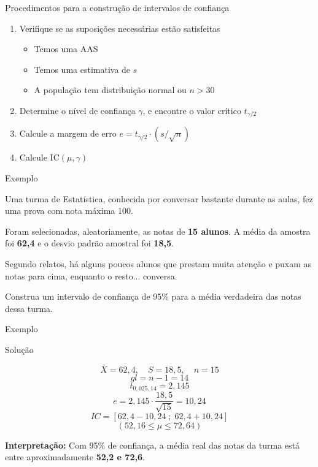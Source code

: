 \documentclass[14pt,aspectratio=1610]{beamer}
\begin{document}
	\begin{frame}{Procedimentos para a construção de intervalos de confiança}
		\begin{block}{}
			\justifying
			\begin{enumerate}
				\item Verifique se as suposições necessárias estão satisfeitas
				\begin{itemize}
					\item Temos uma AAS
					\item Temos uma estimativa de $s$
					\item A população tem distribuição normal ou $n>30$
				\end{itemize}
				
				\item Determine o nível de confiança $\gamma$, e encontre o valor crítico $t_{\gamma/2}$
				\item Calcule a margem de erro $e = t_{\gamma/2} \cdot (s/\sqrt{n})$
				\item Calcule $\text{IC}(\mu, \gamma)$
			\end{enumerate}   
		\end{block}
	\end{frame}
	
	\begin{frame}{Exemplo}
		
		\begin{block}{}
			\justifying
			
			Uma turma de Estatística, conhecida por conversar bastante durante as aulas, fez uma prova com nota máxima 100.
			
			Foram selecionadas, aleatoriamente, as notas de \textbf{15 alunos}. A média da amostra foi \textbf{62,4} e o desvio padrão amostral foi \textbf{18,5}.
			
			Segundo relatos, há alguns poucos alunos que prestam muita atenção e puxam as notas para cima, enquanto o resto... conversa.
			
			Construa um intervalo de confiança de 95\% para a média verdadeira das notas dessa turma.
			
		\end{block}
		
	\end{frame}
	
	\begin{frame}{Exemplo}
		
	\small	
		\begin{block}{Solução}
			
			\[
			\bar{X} = 62,4, \quad S = 18,5, \quad n = 15
			\]
			\[
			gl = n - 1 = 14
			\]
			\[
			t_{0,025, 14} = 2,145
			\]
			\[
			e = 2,145 \cdot \frac{18,5}{\sqrt{15}} = 10,24
			\]
			\[
			IC = \left[62,4 - 10,24 \; ; \; 62,4 + 10,24\right]
			\]
			\[
			(52,16 \leq \mu \leq 72,64)
			\]
			
			\textbf{Interpretação:} Com 95\% de confiança, a média real das notas da turma está entre aproximadamente \textbf{52,2 e 72,6}.
			
		\end{block}
		
	\end{frame}
	
\end{document}
